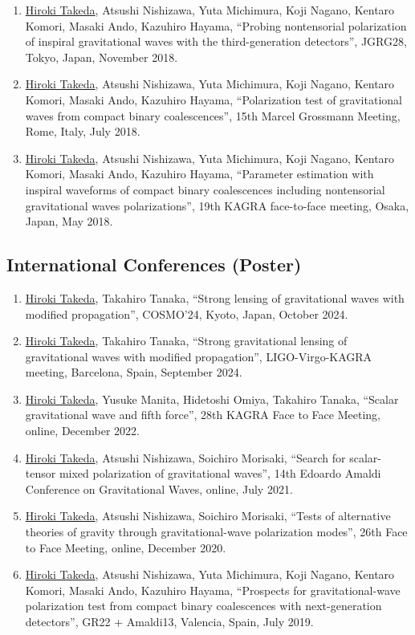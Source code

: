 \documentclass[uplatex, 12pt]{article}
\begin{document}
\begin{enumerate}
\item \uline{Hiroki Takeda}, Atsushi Nishizawa, Yuta Michimura, Koji Nagano, Kentaro Komori, Masaki Ando, Kazuhiro Hayama, “Probing nontensorial polarization of inspiral gravitational waves with the third-generation detectors”, JGRG28, Tokyo, Japan, November 2018.
\item \uline{Hiroki Takeda}, Atsushi Nishizawa, Yuta Michimura, Koji Nagano, Kentaro Komori, Masaki Ando, Kazuhiro Hayama, “Polarization test of gravitational waves from compact binary coalescences”, 15th Marcel Grossmann Meeting, Rome, Italy, July 2018.
\item \uline{Hiroki Takeda}, Atsushi Nishizawa, Yuta Michimura, Koji Nagano, Kentaro Komori, Masaki Ando, Kazuhiro Hayama, “Parameter estimation with inspiral waveforms of compact binary coalescences including nontensorial gravitational waves polarizations”, 19th KAGRA face-to-face meeting, Osaka, Japan, May 2018.
\end{enumerate}
\subsection*{International Conferences (Poster)}
\begin{enumerate}
\item \uline{Hiroki Takeda}, Takahiro Tanaka, “Strong lensing of gravitational waves with modified propagation”, COSMO'24, Kyoto, Japan, October 2024.
\item \uline{Hiroki Takeda}, Takahiro Tanaka, “Strong gravitational lensing of gravitational waves with modified propagation”, LIGO-Virgo-KAGRA meeting, Barcelona, Spain, September 2024.
\item \uline{Hiroki Takeda}, Yusuke Manita, Hidetoshi Omiya, Takahiro Tanaka, “Scalar gravitational wave and fifth force”, 28th KAGRA Face to Face Meeting, online, December 2022.
\item \uline{Hiroki Takeda}, Atsushi Nishizawa, Soichiro Morisaki, “Search for scalar-tensor mixed polarization of gravitational waves”, 14th Edoardo Amaldi Conference on Gravitational Waves, online, July 2021.
\item \uline{Hiroki Takeda}, Atsushi Nishizawa, Soichiro Morisaki, “Tests of alternative theories of gravity through gravitational-wave polarization modes”, 26th Face to Face Meeting, online, December 2020.
\item \uline{Hiroki Takeda}, Atsushi Nishizawa, Yuta Michimura, Koji Nagano, Kentaro Komori, Masaki Ando, Kazuhiro Hayama, “Prospects for gravitational-wave polarization test from compact binary coalescences with next-generation detectors”, GR22 + Amaldi13, Valencia, Spain, July 2019.
\end{enumerate}
\end{document}
